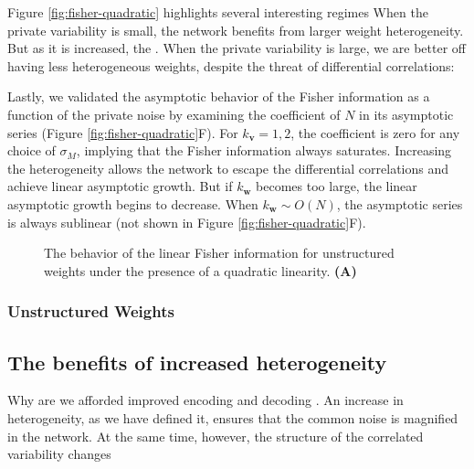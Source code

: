 \documentclass[11pt]{article}
\begin{document}
	Figure \ref{fig:fisher-quadratic} highlights several interesting regimes  When the private variability is small, the network benefits from larger weight heterogeneity. But as it is increased, the . When the private variability is large, we are better off having less heterogeneous weights, despite the threat of differential correlations: 
	
	Lastly, we validated the asymptotic behavior of the Fisher information as a function of the private noise by examining the coefficient of $N$ in its asymptotic series (Figure \ref{fig:fisher-quadratic}F). For $k_{\mathbf{v}}=1,2$, the coefficient is zero for any choice of $\sigma_M$, implying that the Fisher information always saturates. Increasing the heterogeneity allows the network to escape the differential correlations and achieve linear asymptotic growth. But if $k_{\mathbf{w}}$ becomes too large, the linear asymptotic growth begins to decrease. When $k_{\mathbf{w}}\sim O(N)$, the asymptotic series is always sublinear (not shown in Figure \ref{fig:fisher-quadratic}F).
	
	\begin{figure}[t]
		\centering
		\caption{The behavior of the linear Fisher information for unstructured weights under the presence of a quadratic linearity. \textbf{(A)} } 
	\end{figure}
	\subsubsection{Unstructured Weights}
	
	\subsection{The benefits of increased heterogeneity}
	Why are we afforded improved encoding and decoding . An increase in heterogeneity, as we have defined it, ensures that the common noise is magnified in the network. At the same time, however, the structure of the correlated variability changes 
	
\end{document}
